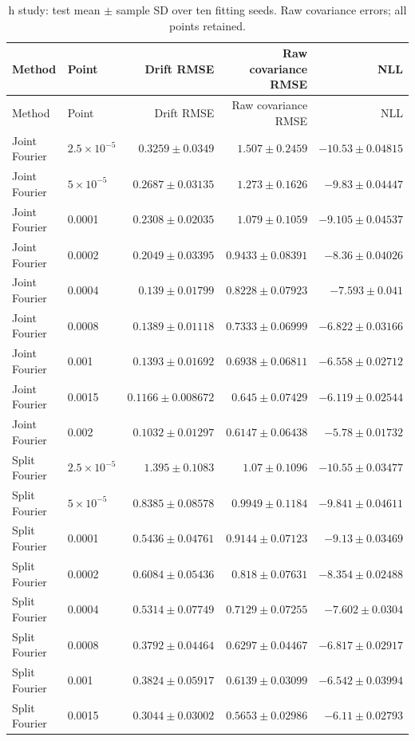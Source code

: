 \begin{longtable}{llrrr}\caption{h study: test mean $\pm$ sample SD over ten fitting seeds. Raw covariance errors; all points retained.}\\\toprule Method & Point & Drift RMSE & Raw covariance RMSE & NLL\\\midrule\endfirsthead\toprule Method & Point & Drift RMSE & Raw covariance RMSE & NLL\\\midrule\endhead
Joint Fourier & $2.5\times10^{-5}$ & $0.3259\pm 0.0349$ & $1.507\pm 0.2459$ & $-10.53\pm 0.04815$\\
Joint Fourier & $5\times10^{-5}$ & $0.2687\pm 0.03135$ & $1.273\pm 0.1626$ & $-9.83\pm 0.04447$\\
Joint Fourier & 0.0001 & $0.2308\pm 0.02035$ & $1.079\pm 0.1059$ & $-9.105\pm 0.04537$\\
Joint Fourier & 0.0002 & $0.2049\pm 0.03395$ & $0.9433\pm 0.08391$ & $-8.36\pm 0.04026$\\
Joint Fourier & 0.0004 & $0.139\pm 0.01799$ & $0.8228\pm 0.07923$ & $-7.593\pm 0.041$\\
Joint Fourier & 0.0008 & $0.1389\pm 0.01118$ & $0.7333\pm 0.06999$ & $-6.822\pm 0.03166$\\
Joint Fourier & 0.001 & $0.1393\pm 0.01692$ & $0.6938\pm 0.06811$ & $-6.558\pm 0.02712$\\
Joint Fourier & 0.0015 & $0.1166\pm 0.008672$ & $0.645\pm 0.07429$ & $-6.119\pm 0.02544$\\
Joint Fourier & 0.002 & $0.1032\pm 0.01297$ & $0.6147\pm 0.06438$ & $-5.78\pm 0.01732$\\
Split Fourier & $2.5\times10^{-5}$ & $1.395\pm 0.1083$ & $1.07\pm 0.1096$ & $-10.55\pm 0.03477$\\
Split Fourier & $5\times10^{-5}$ & $0.8385\pm 0.08578$ & $0.9949\pm 0.1184$ & $-9.841\pm 0.04611$\\
Split Fourier & 0.0001 & $0.5436\pm 0.04761$ & $0.9144\pm 0.07123$ & $-9.13\pm 0.03469$\\
Split Fourier & 0.0002 & $0.6084\pm 0.05436$ & $0.818\pm 0.07631$ & $-8.354\pm 0.02488$\\
Split Fourier & 0.0004 & $0.5314\pm 0.07749$ & $0.7129\pm 0.07255$ & $-7.602\pm 0.0304$\\
Split Fourier & 0.0008 & $0.3792\pm 0.04464$ & $0.6297\pm 0.04467$ & $-6.817\pm 0.02917$\\
Split Fourier & 0.001 & $0.3824\pm 0.05917$ & $0.6139\pm 0.03099$ & $-6.542\pm 0.03994$\\
Split Fourier & 0.0015 & $0.3044\pm 0.03002$ & $0.5653\pm 0.02986$ & $-6.11\pm 0.02793$\\

\end{longtable}
